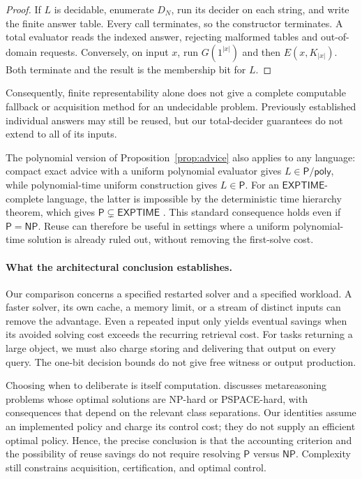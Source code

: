 \documentclass[11pt,a4paper]{article}
\numberwithin{equation}{section}
\newcommand{\Pclass}{\mathsf{P}}
\newcommand{\NPclass}{\mathsf{NP}}
\newcommand{\Ppoly}{\mathsf{P/poly}}
\theoremstyle{plain}
\theoremstyle{definition}
\theoremstyle{remark}
\begin{document}
\begin{proof}
If $L$ is decidable, enumerate $D_N$, run its decider on each string, and write the finite answer table. Every call terminates, so the constructor terminates. A total evaluator reads the indexed answer, rejecting malformed tables and out-of-domain requests. Conversely, on input $x$, run $G(1^{|x|})$ and then $E(x,K_{|x|})$. Both terminate and the result is the membership bit for $L$.
\end{proof}

Consequently, finite representability alone does not give a complete computable fallback or acquisition method for an undecidable problem. Previously established individual answers may still be reused, but our total-decider guarantees do not extend to all of its inputs.

The polynomial version of Proposition~\ref{prop:advice} also applies to any language: compact exact advice with a uniform polynomial evaluator gives $L\in\Ppoly$, while polynomial-time uniform construction gives $L\in\Pclass$. For an $\mathsf{EXPTIME}$-complete language, the latter is impossible by the deterministic time hierarchy theorem, which gives $\Pclass\subsetneq\mathsf{EXPTIME}$ \citep{hartmanis1965complexity,sipser2020theory}. This standard consequence holds even if $\Pclass=\NPclass$. Reuse can therefore be useful in settings where a uniform polynomial-time solution is already ruled out, without removing the first-solve cost.

\paragraph{What the architectural conclusion establishes.}
Our comparison concerns a specified restarted solver and a specified workload. A faster solver, its own cache, a memory limit, or a stream of distinct inputs can remove the advantage. Even a repeated input only yields eventual savings when its avoided solving cost exceeds the recurring retrieval cost. For tasks returning a large object, we must also charge storing and delivering that output on every query. The one-bit decision bounds do not give free witness or output production.

Choosing when to deliberate is itself computation. \citet{conitzer2008metareasoning} discusses metareasoning problems whose optimal solutions are NP-hard or PSPACE-hard, with consequences that depend on the relevant class separations. Our identities assume an implemented policy and charge its control cost; they do not supply an efficient optimal policy. Hence, the precise conclusion is that the accounting criterion and the possibility of reuse savings do not require resolving $\Pclass$ versus $\NPclass$. Complexity still constrains acquisition, certification, and optimal control.
\end{document}
